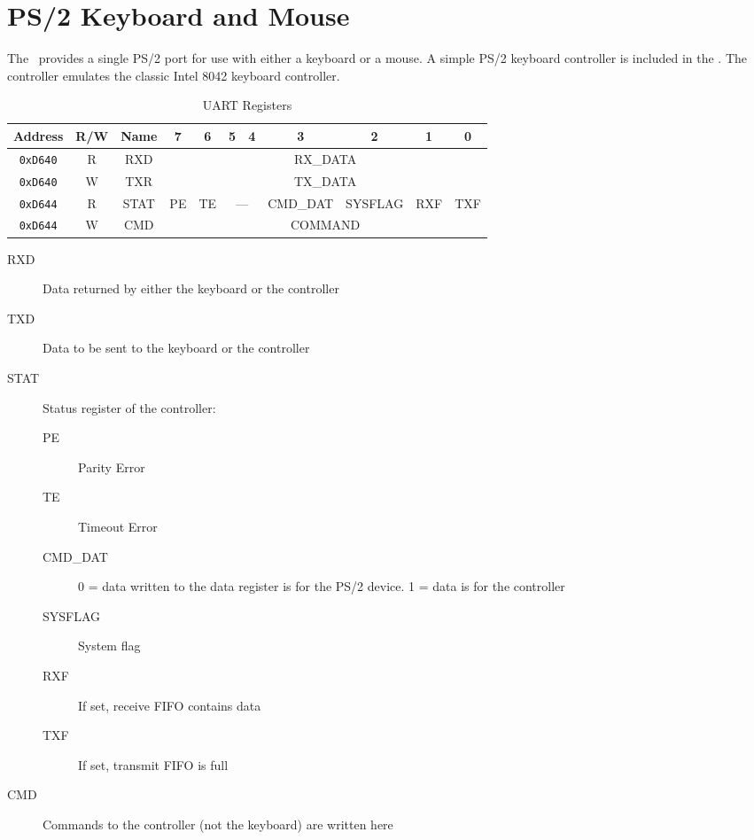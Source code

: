 \chapter{PS/2 Keyboard and Mouse}

The \jr\ provides a single PS/2 port for use with either a keyboard or a mouse. A simple PS/2 keyboard controller is included in the \jr. The controller emulates the classic Intel 8042 keyboard controller.

\begin{table}[h]
    \begin{center}
        \begin{tabular}{|c|c|c|c|c|c|c|c|c|c|c|} \hline
            Address & R/W & Name & 7 & 6 & 5 & 4 & 3 & 2 & 1 & 0 \\\hline\hline
            \verb+0xD640+ & R & RXD & \multicolumn{8}{|c|}{RX\_DATA} \\ \hline
            \verb+0xD640+ & W & TXR & \multicolumn{8}{|c|}{TX\_DATA} \\ \hline
            \verb+0xD644+ & R & STAT & PE & TE & \multicolumn{2}{|c|}{---} & CMD\_DAT & SYSFLAG & RXF & TXF \\ \hline
            \verb+0xD644+ & W & CMD & \multicolumn{8}{|c|}{COMMAND} \\ \hline
        \end{tabular}
    \end{center}
    \caption{UART Registers}
    \label{tab:uart_reg}
\end{table}

\begin{description}
    \item[RXD] Data returned by either the keyboard or the controller

    \item[TXD] Data to be sent to the keyboard or the controller

    \item[STAT] Status register of the controller:
    \begin{description}
        \item[PE] Parity Error
        \item[TE] Timeout Error
        \item[CMD\_DAT] 0 = data written to the data register is for the PS/2 device. 1 = data is for the controller
        \item[SYSFLAG] System flag
        \item[RXF] If set, receive FIFO contains data
        \item[TXF] If set, transmit FIFO is full
    \end{description}

    \item[CMD] Commands to the controller (not the keyboard) are written here
\end{description}
